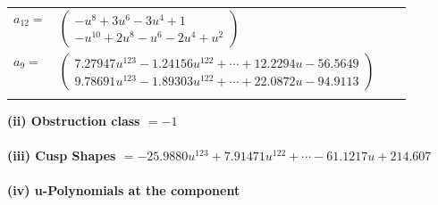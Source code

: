 \documentclass[1p]{elsarticle_modified}
\theoremstyle{definition}
\begin{document}
\begin{tabular}{m{7pt} m{180pt} m{7pt} m{180pt} }
\flushright $a_{12}=$&$\begin{pmatrix}- u^8+3 u^6-3 u^4+1\\- u^{10}+2 u^8- u^6-2 u^4+u^2\end{pmatrix}$ \\
\flushright $a_{9}=$&$\begin{pmatrix}7.27947 u^{123}-1.24156 u^{122}+\cdots+12.2294 u-56.5649\\9.78691 u^{123}-1.89303 u^{122}+\cdots+22.0872 u-94.9113\end{pmatrix}$\\&\end{tabular}
\flushleft \textbf{(ii) Obstruction class $= -1$}\\~\\
\flushleft \textbf{(iii) Cusp Shapes $= -25.9880 u^{123}+7.91471 u^{122}+\cdots-61.1217 u+214.607$}\\~\\
\newpage\renewcommand{\arraystretch}{1}
\flushleft \textbf{(iv) u-Polynomials at the component}\newline \\
\end{document}
